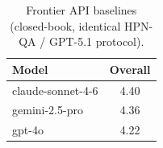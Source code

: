 \begin{table}[t]\centering\footnotesize
\caption{Frontier API baselines (closed-book, identical HPN-QA / GPT-5.1 protocol).}
\label{tab:baselines}
\begin{tabular}{lc}
\toprule
Model & Overall \\ \midrule
claude-sonnet-4-6 & 4.40 \\
gemini-2.5-pro & 4.36 \\
gpt-4o & 4.22 \\
\bottomrule
\end{tabular}
\end{table}
